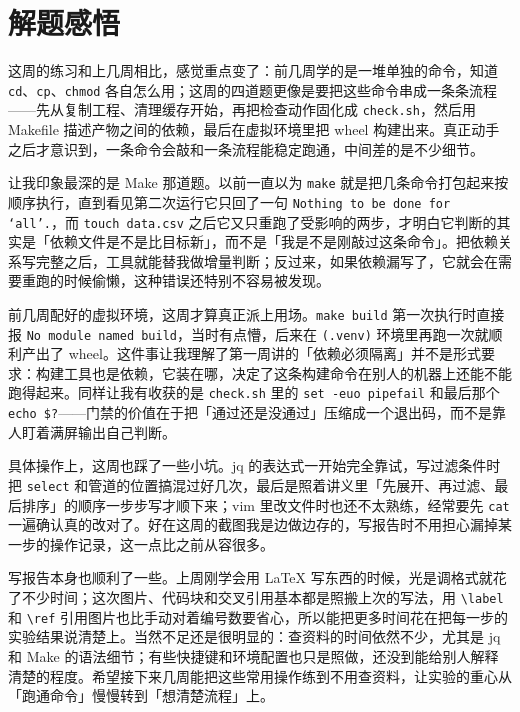 \chapter{解题感悟}
\label{cp:notes}

这周的练习和上几周相比，感觉重点变了：前几周学的是一堆单独的命令，知道 \verb|cd|、\verb|cp|、\verb|chmod| 各自怎么用；这周的四道题更像是要把这些命令串成一条条流程——先从复制工程、清理缓存开始，再把检查动作固化成 \verb|check.sh|，然后用 Makefile 描述产物之间的依赖，最后在虚拟环境里把 wheel 构建出来。真正动手之后才意识到，一条命令会敲和一条流程能稳定跑通，中间差的是不少细节。

让我印象最深的是 Make 那道题。以前一直以为 \verb|make| 就是把几条命令打包起来按顺序执行，直到看见第二次运行它只回了一句 \texttt{Nothing to be done for `all'.}，而 \verb|touch data.csv| 之后它又只重跑了受影响的两步，才明白它判断的其实是「依赖文件是不是比目标新」，而不是「我是不是刚敲过这条命令」。把依赖关系写完整之后，工具就能替我做增量判断；反过来，如果依赖漏写了，它就会在需要重跑的时候偷懒，这种错误还特别不容易被发现。

前几周配好的虚拟环境，这周才算真正派上用场。\verb|make build| 第一次执行时直接报 \texttt{No module named build}，当时有点懵，后来在 \verb|(.venv)| 环境里再跑一次就顺利产出了 wheel。这件事让我理解了第一周讲的「依赖必须隔离」并不是形式要求：构建工具也是依赖，它装在哪，决定了这条构建命令在别人的机器上还能不能跑得起来。同样让我有收获的是 \verb|check.sh| 里的 \verb|set -euo pipefail| 和最后那个 \verb|echo $?|——门禁的价值在于把「通过还是没通过」压缩成一个退出码，而不是靠人盯着满屏输出自己判断。

具体操作上，这周也踩了一些小坑。jq 的表达式一开始完全靠试，写过滤条件时把 \verb|select| 和管道的位置搞混过好几次，最后是照着讲义里「先展开、再过滤、最后排序」的顺序一步步写才顺下来；vim 里改文件时也还不太熟练，经常要先 \verb|cat| 一遍确认真的改对了。好在这周的截图我是边做边存的，写报告时不用担心漏掉某一步的操作记录，这一点比之前从容很多。

写报告本身也顺利了一些。上周刚学会用 LaTeX 写东西的时候，光是调格式就花了不少时间；这次图片、代码块和交叉引用基本都是照搬上次的写法，用 \verb|\label| 和 \verb|\ref| 引用图片也比手动对着编号数要省心，所以能把更多时间花在把每一步的实验结果说清楚上。当然不足还是很明显的：查资料的时间依然不少，尤其是 jq 和 Make 的语法细节；有些快捷键和环境配置也只是照做，还没到能给别人解释清楚的程度。希望接下来几周能把这些常用操作练到不用查资料，让实验的重心从「跑通命令」慢慢转到「想清楚流程」上。
